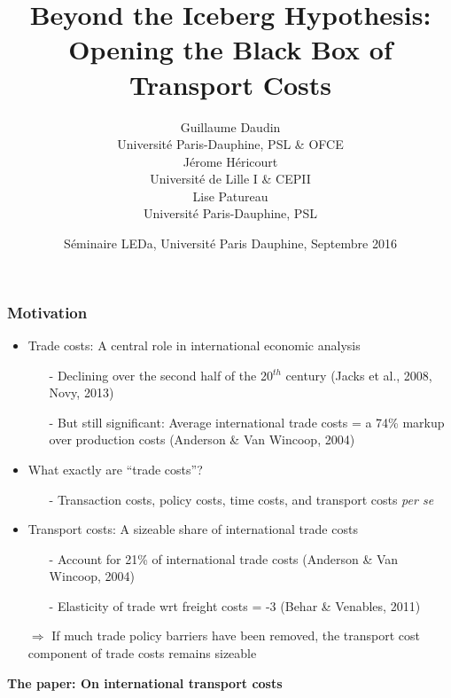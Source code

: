 \documentclass[10 pt,Helvetica, french]{beamer}
\date[September 2016]{S\'{e}minaire LEDa, Université Paris Dauphine, Septembre 2016}
\title[Trade Costs Black Box]{Beyond the Iceberg Hypothesis: \\Opening the Black Box of Transport Costs}
\author[Daudin et al.]{Guillaume Daudin\\
{\footnotesize Universit\'{e} Paris-Dauphine, PSL \& OFCE }\\ \smallskip
J\'{e}rome H\'{e}ricourt \\
{\footnotesize Universit\'{e} de Lille I \& CEPII }\\  \smallskip
Lise Patureau \\
{\footnotesize  Universit\'{e} Paris-Dauphine, PSL}}
\begin{document}
\begin{frame}[plain]
\titlepage
\end{frame}


\begin{frame}
\frametitle{Motivation}
\begin{itemize}
\item Trade costs: A central role in international economic analysis \vspace{0.1cm}
\begin{itemize}
\item[-] Declining over the second half of the 20$^{th}$ century (Jacks et al., 2008, Novy, 2013) \vspace{0.1cm}
\item[-] But still significant: Average international trade costs = a 74\% markup over production costs (Anderson \& Van Wincoop, 2004)
\end{itemize}
\item What exactly are ``trade costs''?  \vspace{0.1cm}
\begin{itemize}
\item[-] Transaction costs, policy costs, time costs, and transport costs \textit{per se}
\end{itemize}
\item Transport costs: A sizeable share of international trade costs \vspace{0.1cm}
\begin{itemize}
\item[-] Account for 21\% of international trade costs (Anderson \& Van Wincoop, 2004) \vspace{0.1cm}
\item[-] Elasticity of trade wrt freight costs = -3 (Behar \& Venables, 2011) \vspace{0.1cm}
\end{itemize}
\item[$\Rightarrow$] If much trade policy barriers have been removed, the transport cost component of trade costs remains sizeable \vspace{0.1cm}
\end{itemize}
\textbf{The paper: On international transport costs}

\end{frame}
\end{document}
